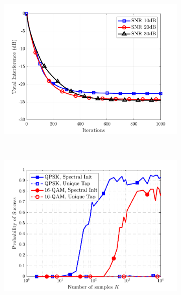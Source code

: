 \begin{figure}
\begin{subfigure}[t]{0.32\textwidth}
\end{subfigure}\hfill
\begin{subfigure}[t]{0.32\textwidth}
\includegraphics[width=\linewidth]{./figs/wfcma_figs/BF_WF_TI_16QAM_L=4_M=8_K=400_2.pdf}	
\label{wfcma:fig:wf_ssr_16qam_M8L4}
\end{subfigure}\hfill
\\
\begin{subfigure}[t]{0.32\textwidth}
\includegraphics[width=\linewidth]{./figs/wfcma_figs/BF_WF_sucess_allmods_L=9_M=16_T=1000_mu=1e-4.pdf}	

\end{subfigure}
\end{figure}
